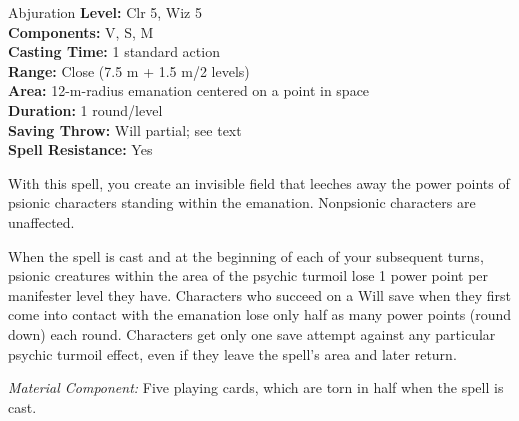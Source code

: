 {Abjuration}
{
	\textbf{Level:} Clr 5, Wiz 5\\
	\textbf{Components:} V, S, M\\
	\textbf{Casting Time:} 1 standard action\\
	\textbf{Range:} Close (7.5 m + 1.5 m/2 levels)\\
	\textbf{Area:} 12-m-radius emanation centered on a point in space\\
	\textbf{Duration:} 1 round/level\\
	\textbf{Saving Throw:} Will partial; see text\\
	\textbf{Spell Resistance:} Yes\\
}
{
	With this spell, you create an invisible field that leeches away the power points of psionic characters standing within the emanation. Nonpsionic characters are unaffected.

	When the spell is cast and at the beginning of each of your subsequent turns, psionic creatures within the area of the psychic turmoil lose 1 power point per manifester level they have. Characters who succeed on a Will save when they first come into contact with the emanation lose only half as many power points (round down) each round. Characters get only one save attempt against any particular psychic turmoil effect, even if they leave the spell's area and later return.

	\textit{Material Component:} Five playing cards, which are torn in half when the spell is cast.
}